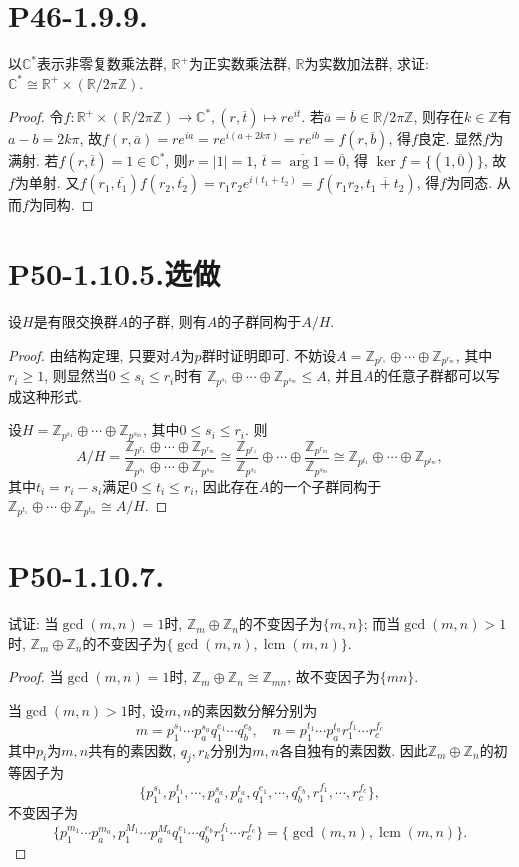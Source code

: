 \documentclass[12pt, a4paper, fontset=windows]{ctexart}
\newcommand{\C}{\mathbb{C}}
\newcommand{\R}{\mathbb{R}}
\newcommand{\Z}{\mathbb{Z}}
\newcommand{\abs}[1]{\left|{#1}\right|}
\newcommand{\cl}[1]{\overline{#1}} %
\newcommand{\isom}{\cong} %
\newcommand{\lcm}{\operatorname{lcm}}
\newcommand{\xuan}{{\normalsize 选做}}
\begin{document}
\section*{P46-1.9.9.}
\label{C-log}

以$\C^*$表示非零复数乘法群, $\R^+$为正实数乘法群, $\R$为实数加法群, 
求证: $\C^*\isom\R^+\times(\R/2\pi\Z)$. 

\begin{proof}
令$f:\R^+\times(\R/2\pi\Z)\to\C^*,(r,\cl{t})\mapsto re^{it}$. 
若$\cl{a}=\cl{b}\in\R/2\pi\Z$, 则存在$k\in\Z$有$a-b=2k\pi$, 
故$f(r,\cl{a})=re^{ia}=re^{i(a+2k\pi)}=re^{ib}=f(r,\cl{b})$, 
得$f$良定. 显然$f$为满射. 若$f(r,\cl{t})=1\in\C^*$, 
则$r=\abs{1}=1$, $\cl{t}=\cl{\arg 1}=\cl{0}$, 得
$\ker f=\{(1,\cl{0})\}$, 故$f$为单射. 
又$f(r_1,\cl{t_1})f(r_2,\cl{t_2})=r_1r_2e^{i(t_1+t_2)}=f(r_1r_2,\cl{t_1+t_2})$, 
得$f$为同态. 从而$f$为同构. 
\end{proof}

\section*{P50-1.10.5.\xuan}

设$H$是有限交换群$A$的子群, 则有$A$的子群同构于$A/H$. 

\begin{proof}
由结构定理, 只要对$A$为$p$群时证明即可. 
不妨设$A=\Z_{p^{r_1}}\oplus\cdots\oplus\Z_{p^{r_m}}$, 
其中$r_i\ge 1$, 则显然当$0\le s_i\le r_i$时有
$\Z_{p^{s_1}}\oplus\cdots\oplus\Z_{p^{s_m}}\le A$, 
并且$A$的任意子群都可以写成这种形式. 

设$H=\Z_{p^{s_1}}\oplus\cdots\oplus\Z_{p^{s_m}}$, 
其中$0\le s_i\le r_i$. 则
\[A/H=\frac{\Z_{p^{r_1}}\oplus\cdots\oplus\Z_{p^{r_m}}}{\Z_{p^{s_1}}\oplus\cdots\oplus\Z_{p^{s_m}}}
\isom\frac{\Z_{p^{r_1}}}{\Z_{p^{s_1}}}\oplus\cdots\oplus\frac{\Z_{p^{r_m}}}{\Z_{p^{s_m}}}
\isom\Z_{p^{t_1}}\oplus\cdots\oplus\Z_{p^{t_m}},\]
其中$t_i=r_i-s_i$满足$0\le t_i\le r_i$, 
因此存在$A$的一个子群同构于$\Z_{p^{t_1}}\oplus\cdots\oplus\Z_{p^{t_m}}\isom A/H$. 
\end{proof}

\section*{P50-1.10.7.}
\label{gcd-inv}

试证: 当$\gcd(m,n)=1$时, $\Z_m\oplus\Z_n$的不变因子为$\{m,n\}$; 
而当$\gcd(m,n)>1$时, $\Z_m\oplus\Z_n$的不变因子为$\{\gcd(m,n),\lcm(m,n)\}$. 

\begin{proof}
当$\gcd(m,n)=1$时, $\Z_m\oplus\Z_n\isom\Z_{mn}$, 故不变因子为$\{mn\}$. 

当$\gcd(m,n)>1$时, 设$m,n$的素因数分解分别为
\[m=p_1^{s_1}\cdots p_a^{s_a}q_1^{e_1}\cdots q_b^{e_b},\quad n=p_1^{t_1}\cdots p_a^{t_a}r_1^{f_1}\cdots r_c^{f_c}\]
其中$p_i$为$m,n$共有的素因数, $q_j,r_k$分别为$m,n$各自独有的素因数. 
因此$\Z_m\oplus\Z_n$的初等因子为
\[\{p_1^{s_1},p_1^{t_1},\cdots,p_a^{s_a},p_a^{t_a},q_1^{e_1},\cdots,q_b^{e_b},r_1^{f_1},\cdots,r_c^{f_c}\},\]
不变因子为\[\{p_1^{m_1}\cdots p_a^{m_a},p_1^{M_1}\cdots p_a^{M_a}q_1^{e_1}\cdots q_b^{e_b}r_1^{f_1}\cdots r_c^{f_c}\}=\{\gcd(m,n),\lcm(m,n)\}.\]
\end{proof}
\end{document}
